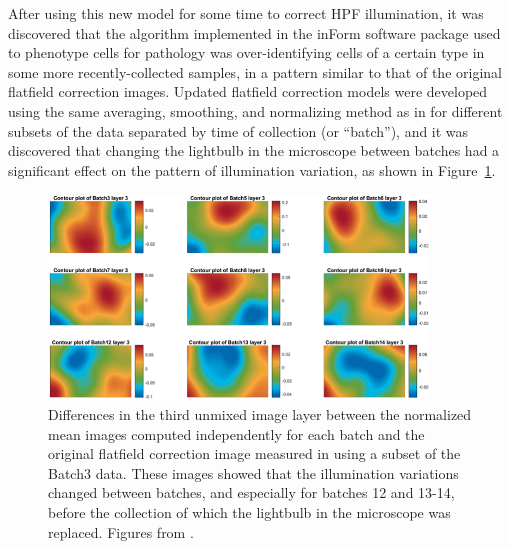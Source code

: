 \documentclass[letterpaper,11pt]{article}
\newcommand{\reffig}[1]{Figure~\ref{#1}}
\begin{document}
After using this new model for some time to correct HPF illumination, it was discovered \cite{Ben_flatfielding_1} that the algorithm implemented in the inForm software package \cite{Kramer2018} used to phenotype cells for pathology was over-identifying cells of a certain type in some more recently-collected samples, in a pattern similar to that of the original flatfield correction images. Updated flatfield correction models were developed using the same averaging, smoothing, and normalizing method as in \cite{Alex_flatfielding_2} for different subsets of the data separated by time of collection (or ``batch''), and it was discovered that changing the lightbulb in the microscope between batches had a significant effect on the pattern of illumination variation, as shown in \reffig{fig:third_flatfielding}. 

\begin{figure}[!ht]
\centering
\includegraphics[width=0.9\textwidth]{images/introduction/third_flatfield_differences}
\caption{\footnotesize Differences in the third unmixed image layer between the normalized mean images computed independently for each batch and the original flatfield correction image measured in \cite{Alex_flatfielding_2} using a subset of the Batch3 data. These images showed that the illumination variations changed between batches, and especially for batches 12 and 13-14, before the collection of which the lightbulb in the microscope was replaced. Figures from \cite{Ben_flatfielding_1}.}
\label{fig:third_flatfielding}
\end{figure}
\end{document}
